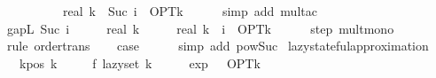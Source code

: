 \begin{isabellebody}
\ \ \ \ \ {\isacharequal}{\kern0pt}\ {\isacharparenleft}{\kern0pt}{}\ {\isacharminus}{\kern0pt}\ {}\ {\isacharslash}{\kern0pt}\ real\ k{\isacharparenright}{\kern0pt}\ {\isacharcircum}{\kern0pt}\ Suc\ i\ {\isacharasterisk}{\kern0pt}\ OPT{\isacharunderscore}{\kern0pt}k{\isachardoublequoteclose}\isanewline
\ \ \ \ \isamarkupfalse%
\ {\isacharparenleft}{\kern0pt}simp\ add{\isacharcolon}{\kern0pt}\ mult{\isacharunderscore}{\kern0pt}ac{\isacharparenright}{\kern0pt}\isanewline
\isanewline
\ \ \isamarkupfalse%
\ {\isachardoublequoteopen}gapL\ {\isacharparenleft}{\kern0pt}Suc\ i{\isacharparenright}{\kern0pt}\ {\isasymle}\ {\isacharparenleft}{\kern0pt}{}\ {\isacharminus}{\kern0pt}\ {}\ {\isacharslash}{\kern0pt}\ real\ k{\isacharparenright}{\kern0pt}\ {\isacharasterisk}{\kern0pt}\ {\isacharparenleft}{\kern0pt}{\isacharparenleft}{\kern0pt}{}\ {\isacharminus}{\kern0pt}\ {}\ {\isacharslash}{\kern0pt}\ real\ k{\isacharparenright}{\kern0pt}\ {\isacharcircum}{\kern0pt}\ i\ {\isacharasterisk}{\kern0pt}\ OPT{\isacharunderscore}{\kern0pt}k{\isacharparenright}{\kern0pt}{\isachardoublequoteclose}\isanewline
\ \ \ \ \isamarkupfalse%
\ step\ mult{\isacharunderscore}{\kern0pt}mono\isanewline
\ \ \ \ \isamarkupfalse%
\ {\isacharparenleft}{\kern0pt}rule\ order{\isacharunderscore}{\kern0pt}trans{\isacharparenright}{\kern0pt}\isanewline
\ \ \isamarkupfalse%
\ {\isacharquery}{\kern0pt}case\isanewline
\ \ \ \ \isamarkupfalse%
\ {\isacharparenleft}{\kern0pt}simp\ add{\isacharcolon}{\kern0pt}\ pow{\isacharunderscore}{\kern0pt}Suc{\isacharparenright}{\kern0pt}\isanewline
{}\isamarkupfalse%
%
\endisatagproof
{\isafoldproof}%
%
\isadelimproof
\isanewline
%
\endisadelimproof
\isanewline
{}\isamarkupfalse%
\ lazy{\isacharunderscore}{\kern0pt}stateful{\isacharunderscore}{\kern0pt}approximation{\isacharcolon}{\kern0pt}\isanewline
\ \ \ k{\isacharunderscore}{\kern0pt}pos{\isacharcolon}{\kern0pt}\ {\isachardoublequoteopen}k\ {\isachargreater}{\kern0pt}\ {}{\isachardoublequoteclose}\isanewline
\ \ \ {\isachardoublequoteopen}f\ {\isacharparenleft}{\kern0pt}lazy{\isacharunderscore}{\kern0pt}set\ k{\isacharparenright}{\kern0pt}\ {\isasymge}\ {\isacharparenleft}{\kern0pt}{}\ {\isacharminus}{\kern0pt}\ {}\ {\isacharslash}{\kern0pt}\ exp\ {}{\isacharparenright}{\kern0pt}\ {\isacharasterisk}{\kern0pt}\ OPT{\isacharunderscore}{\kern0pt}k{\isachardoublequoteclose}\isanewline

\end{isabellebody}

